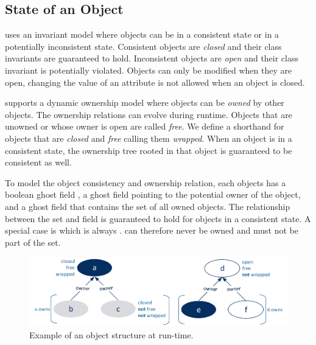 \subsection{State of an Object}


\AutoProof uses an invariant model where objects can be in a consistent state or in a potentially inconsistent state. Consistent objects are \emph{closed} and their class invariants are guaranteed to hold. Inconsistent objects are \emph{open} and their class invariant is potentially violated. Objects can only be modified when they are open, changing the value of an attribute is not allowed when an object is closed.

\AutoProof supports a dynamic ownership model where objects can be \emph{owned} by other objects. The ownership relations can evolve during runtime. Objects that are unowned or whose owner is open are called \emph{free}. We define a shorthand for objects that are \emph{closed} and \emph{free} calling them \emph{wrapped}. When an object is in a consistent state, the ownership tree rooted in that object is guaranteed to be consistent as well.

To model the object consistency and ownership relation, each objects has a boolean ghost field , a ghost field  pointing to the potential owner of the object, and a ghost field  that contains the set of all owned objects. The relationship between the  set and  field is guaranteed to hold for objects in a consistent state. A special case is  which is always .  can therefore never be owned and must not be part of the  set.

\begin{figure}[!htb]
\begin{center}
\includegraphics[width=\columnwidth]{images/objectstate.pdf}
\end{center}
\caption{Example of an object structure at run-time.} 
\label{fig:objectstate}
\end{figure}

